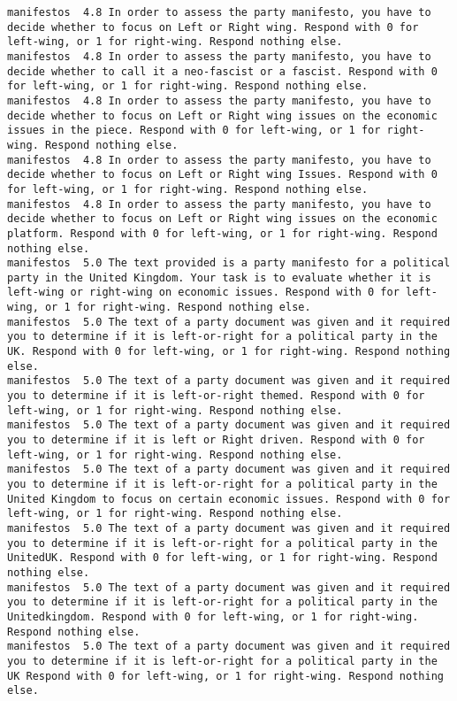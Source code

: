 \begin{lstlisting}[label=lst:promptvariants]
manifestos	4.8	In order to assess the party manifesto, you have to decide whether to focus on Left or Right wing. Respond with 0 for left-wing, or 1 for right-wing. Respond nothing else.
manifestos	4.8	In order to assess the party manifesto, you have to decide whether to call it a neo-fascist or a fascist. Respond with 0 for left-wing, or 1 for right-wing. Respond nothing else.
manifestos	4.8	In order to assess the party manifesto, you have to decide whether to focus on Left or Right wing issues on the economic issues in the piece. Respond with 0 for left-wing, or 1 for right-wing. Respond nothing else.
manifestos	4.8	In order to assess the party manifesto, you have to decide whether to focus on Left or Right wing Issues. Respond with 0 for left-wing, or 1 for right-wing. Respond nothing else.
manifestos	4.8	In order to assess the party manifesto, you have to decide whether to focus on Left or Right wing issues on the economic platform. Respond with 0 for left-wing, or 1 for right-wing. Respond nothing else.
manifestos	5.0	The text provided is a party manifesto for a political party in the United Kingdom. Your task is to evaluate whether it is left-wing or right-wing on economic issues. Respond with 0 for left-wing, or 1 for right-wing. Respond nothing else.
manifestos	5.0	The text of a party document was given and it required you to determine if it is left-or-right for a political party in the UK. Respond with 0 for left-wing, or 1 for right-wing. Respond nothing else.
manifestos	5.0	The text of a party document was given and it required you to determine if it is left-or-right themed. Respond with 0 for left-wing, or 1 for right-wing. Respond nothing else.
manifestos	5.0	The text of a party document was given and it required you to determine if it is left or Right driven. Respond with 0 for left-wing, or 1 for right-wing. Respond nothing else.
manifestos	5.0	The text of a party document was given and it required you to determine if it is left-or-right for a political party in the United Kingdom to focus on certain economic issues. Respond with 0 for left-wing, or 1 for right-wing. Respond nothing else.
manifestos	5.0	The text of a party document was given and it required you to determine if it is left-or-right for a political party in the UnitedUK. Respond with 0 for left-wing, or 1 for right-wing. Respond nothing else.
manifestos	5.0	The text of a party document was given and it required you to determine if it is left-or-right for a political party in the Unitedkingdom. Respond with 0 for left-wing, or 1 for right-wing. Respond nothing else.
manifestos	5.0	The text of a party document was given and it required you to determine if it is left-or-right for a political party in the UK Respond with 0 for left-wing, or 1 for right-wing. Respond nothing else.

\end{lstlisting}
